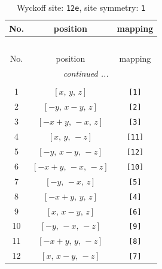 \documentclass[fleqn,8pt]{jsarticle}
\begin{document}
\begin{longtable}{ccc}
\caption{Wyckoff site: {\tt 12e}, site symmetry: {\tt 1}}
 \\
 \hline \hline
No. & position & mapping \\ \hline \endfirsthead

\multicolumn{2}{l}{\tablename\ \thetable{}} \\
 \hline \hline
No. & position & mapping \\ \hline \endhead

 \hline \hline
\multicolumn{2}{r}{\footnotesize\it continued ...} \\ \endfoot

 \hline \hline
\multicolumn{2}{r}{} \\ \endlastfoot

1 & $\left[ x,\, y,\, z \right]$ & {\tt [1]} \\ \hline
2 & $\left[ - y,\, x - y,\, z \right]$ & {\tt [2]} \\ \hline
3 & $\left[ - x + y,\, - x,\, z \right]$ & {\tt [3]} \\ \hline
4 & $\left[ x,\, y,\, - z \right]$ & {\tt [11]} \\ \hline
5 & $\left[ - y,\, x - y,\, - z \right]$ & {\tt [12]} \\ \hline
6 & $\left[ - x + y,\, - x,\, - z \right]$ & {\tt [10]} \\ \hline
7 & $\left[ - y,\, - x,\, z \right]$ & {\tt [5]} \\ \hline
8 & $\left[ - x + y,\, y,\, z \right]$ & {\tt [4]} \\ \hline
9 & $\left[ x,\, x - y,\, z \right]$ & {\tt [6]} \\ \hline
10 & $\left[ - y,\, - x,\, - z \right]$ & {\tt [9]} \\ \hline
11 & $\left[ - x + y,\, y,\, - z \right]$ & {\tt [8]} \\ \hline
12 & $\left[ x,\, x - y,\, - z \right]$ & {\tt [7]} \\
\end{longtable}
\end{document}
